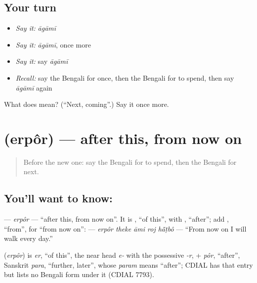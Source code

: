 \subsection*{Your turn}
\begin{itemize}
\raggedright
  \item \emph{Say it:} \emph{āgāmī}
  \item \emph{Say it:} \emph{āgāmī}, once more
  \item \emph{Say it:} say \emph{āgāmī}
  \item \emph{Recall:} say the Bengali for once, then the Bengali for to spend, then say \emph{āgāmī} again
\end{itemize}

\begin{tcolorbox}[breakable,colback=teal!4,colframe=teal!35!black,title={Before you move on}]
What does  mean? (\textquotedblleft{}Next, coming\textquotedblright{}.) Say it once more.
\end{tcolorbox}
\section[\texorpdfstring{\bn{এরপর} (erpôr)}{এরপর (erpôr)}]{ (erpôr) — after this, from now on}

\label{lesson:BN-C146-erpor}



\begin{quote}
Before the new one: say the Bengali for to spend, then the Bengali for next.
\end{quote}

\subsection*{You'll want to know: }
\textbf{} — \emph{erpôr} — \textquotedblleft{}after this, from now on\textquotedblright{}. It is \textbf{}, \textquotedblleft{}of this\textquotedblright{}, with \textbf{}, \textquotedblleft{}after\textquotedblright{}; add \textbf{}, \textquotedblleft{}from\textquotedblright{}, for \textquotedblleft{}from now on\textquotedblright{}: \textbf{    } — \emph{erpôr theke āmi roj hā̃ṭbô} — \textquotedblleft{}From now on I will walk every day.\textquotedblright{}

\begin{cousinweb}
\textbf{} (\emph{erpôr}) is \emph{er}, \textquotedblleft{}of this\textquotedblright{}, the near head \emph{e-} with the possessive \emph{-r}, + \emph{pôr}, \textquotedblleft{}after\textquotedblright{}, Sanskrit \emph{para}, \textquotedblleft{}further, later\textquotedblright{}, whose \emph{param} means \textquotedblleft{}after\textquotedblright{}; CDIAL has that entry but lists no Bengali form under it (CDIAL 7793).
\end{cousinweb}

